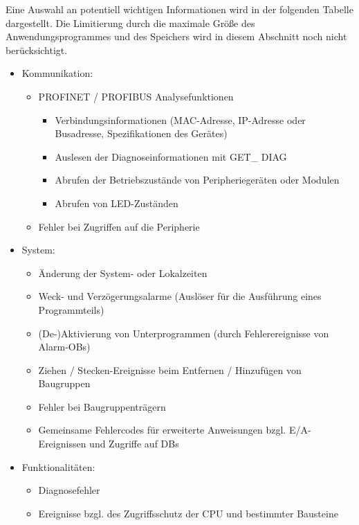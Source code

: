 Eine Auswahl an potentiell wichtigen Informationen wird in der folgenden Tabelle dargestellt. Die Limitierung durch die maximale Größe des Anwendungsprogrammes und des Speichers wird in diesem Abschnitt noch nicht berücksichtigt. 
\begin{itemize}
\item Kommunikation: 
\begin{itemize}
\item PROFINET / PROFIBUS Analysefunktionen 
\begin{itemize}
\item Verbindungsinformationen (MAC-Adresse, IP-Adresse oder Busadresse, Spezifikationen des Gerätes)
\item Auslesen der Diagnoseinformationen mit GET\_ DIAG
\item Abrufen der Betriebszustände von Peripheriegeräten oder Modulen
\item Abrufen von LED-Zuständen
\end{itemize}
\item Fehler bei Zugriffen auf die Peripherie
\end{itemize}

\item System:
\begin{itemize}
\item Änderung der System- oder Lokalzeiten
\item Weck- und Verzögerungsalarme (Auslöser für die Ausführung eines Programmteils)
\item (De-)Aktivierung von Unterprogrammen (durch Fehlerereignisse von Alarm-OBs)
\item Ziehen / Stecken-Ereignisse beim Entfernen / Hinzufügen von Baugruppen
\item Fehler bei Baugruppenträgern 
\item Gemeinsame Fehlercodes für erweiterte Anweisungen bzgl. E/A-Ereignissen und Zugriffe auf DBs
\end{itemize}

\item Funktionalitäten:
\begin{itemize}
\item Diagnosefehler
\item Ereignisse bzgl. des Zugriffsschutz der CPU und bestimmter Bausteine
\end{itemize}
\end{itemize}

